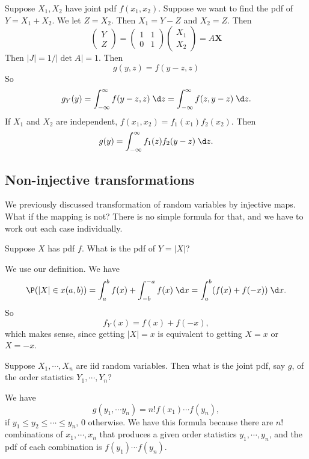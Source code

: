 \documentclass[a4paper]{article}
\begin{document}
\begin{eg}
  Suppose $X_1, X_2$ have joint pdf $f(x_1,x_2)$. Suppose we want to find the pdf of $Y = X_1 + X_2$. We let $Z = X_2$. Then $X_1 = Y - Z$ and $X_2 = Z$. Then
  \[
    \begin{pmatrix}
      Y\\
      Z
    \end{pmatrix} = 
    \begin{pmatrix}
      1 & 1 \\
      0 & 1
    \end{pmatrix}
    \begin{pmatrix}
      X_1\\
      X_2
    \end{pmatrix}
    = A\mathbf{X}
  \]
  Then $|J| = 1/|\det A| = 1$. Then
  \[
    g(y, z) = f(y - z, z)
  \]
  So
  \[
    g_Y(y) = \int_{-\infty}^\infty f(y - z, z)\;\d z = \int_{-\infty}^\infty f(z, y - z)\;\d z.
  \]
  If $X_1$ and $X_2$ are independent, $f(x_1, x_2) = f_1(x_1) f_2(x_2)$. Then
  \[
    g(y) = \int_{-\infty}^\infty f_1(z) f_2(y - z)\;\d z.
  \]
\end{eg}

\subsection{Non-injective transformations}
We previously discussed transformation of random variables by injective maps. What if the mapping is not? There is no simple formula for that, and we have to work out each case individually.

\begin{eg}
  Suppose $X$ has pdf $f$. What is the pdf of $Y=|X|$?

  We use our definition. We have
  \[
    \P(|X| \in x(a, b)) = \int_a^b f(x) + \int_{-b}^{-a} f(x)\;\d x = \int_a^b (f(x) + f(-x))\;\d x.
  \]
  So
  \[
    f_Y(x) = f(x) + f(-x),
  \]
  which makes sense, since getting $|X| = x$ is equivalent to getting $X = x$ or $X = -x$.
\end{eg}

\begin{eg}
  Suppose $X_1, \cdots, X_n$ are iid random variables. Then what is the joint pdf, say $g$, of the order statistics $Y_1,\cdots, Y_n$?

  We have
  \[
    g(y_1, \cdots y_n) = n! f(x_1)\cdots f(y_n),
  \]
  if $y_1 \leq y_2\leq \cdots \leq y_n$, 0 otherwise. We have this formula because there are $n!$ combinations of $x_1, \cdots, x_n$ that produces a given order statistics $y_1, \cdots, y_n$, and the pdf of each combination is $f(y_1)\cdots f(y_n)$.
\end{eg}
\end{document}
